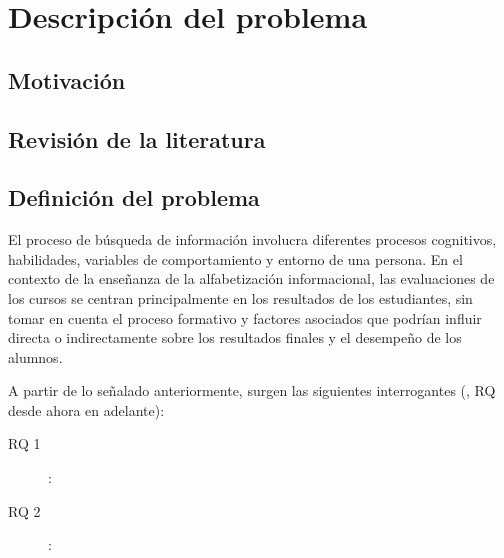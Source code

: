 \chapter{Descripción del problema}
\label{chp:descripcion-problema}


\section{Motivación}
\label{sec:motivacion}

\section{Revisión de la literatura}
\label{sec:revision-literatura}

\section{Definición del problema}
\label{sec:definicion_problema}
El proceso de búsqueda de información involucra diferentes procesos cognitivos, habilidades, variables de comportamiento y entorno de una persona. En el contexto de la enseñanza de la alfabetización informacional, las evaluaciones de los cursos se centran principalmente en los resultados de los estudiantes, sin tomar en cuenta el proceso formativo y factores asociados que podrían influir directa o indirectamente sobre los resultados finales y el desempeño de los alumnos.  

A partir de lo señalado anteriormente, surgen las siguientes interrogantes (, RQ desde ahora en adelante):

\begin{description}
	\item [RQ 1]: 
	\item [RQ 2]:
\end{description}